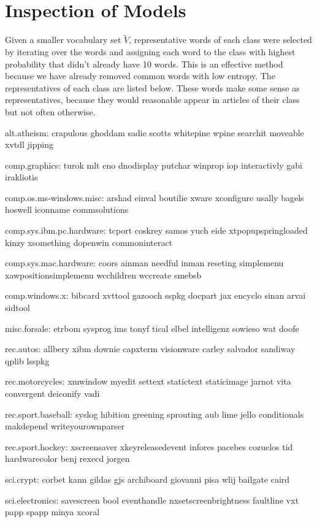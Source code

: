 \documentclass[letterpaper,10pt,onecolumn]{IEEEconf}
\begin{document}
\section{Inspection of Models}

Given a smaller vocabulary set $\tilde{V}$, representative words of each class were selected by iterating over the words and assigning each word to the class with highest probability that didn't already have 10 words. This is an effective method because we have already removed common words with low entropy. The representatives of each class are listed below. These words make some sense as representatives, because they would reasonable appear in articles of their class but not often otherwise.

alt.atheism: 
crapulous
ghoddam
sadie
scotts
whitepine
wpine
searchit
moveable
xvtdl
jipping
 
comp.graphics:
turok
mlt
eno
dnodisplay
putchar
winprop
iop
interactivly
gabi
irakliotis
 
comp.os.ms-windows.misc:
arshad
einval
boutilie
xware
xconfigure
usally
bagels
hoswell
iconname
commsolutions
 
comp.sys.ibm.pc.hardware:
tcport
coskrey
samos
yuch
eide
xtpopupspringloaded
kinzy
xsomething
dopenwin
commoninteract
 
comp.sys.mac.hardware:
coors
ainman
needful
inman
reseting
simplemenu
xawpositionsimplemenu
wcchildren
wccreate
smebsb
 
comp.windows.x:
bibcard
xvttool
gazooch
sspkg
docpart
jax
encyclo
sinan
arvai
sidtool
 
misc.forsale:
etrbom
sysprog
ims
tonyf
tical
elbel
intelligenz
sowieso
wat
doofe
 
rec.autos:
allbery
xibm
downie
capxterm
visionware
carley
salvador
sandiway
qplib
lsspkg
 
rec.motorcycles:
xmwindow
myedit
settext
statictext
staticimage
jarnot
vita
convergent
deiconify
vadi
 
rec.sport.baseball:
syslog
hibition
greening
sprouting
aub
lime
jello
conditionals
makdepend
writeyourownparser
 
rec.sport.hockey:
xscreensaver
xkeyreleasedevent
infores
pacebes
cozuelos
tid
hardwarecolor
benj
rexecd
jorgen
 
sci.crypt:
corbet
kann
gildas
gjs
archiboard
giovanni
pisa
wlij
bailgate
caird
 
sci.electronics:
savescreen
bool
eventhandle
nxsetscreenbrightness
faultline
vxt
papp
spapp
minya
xcoral
 
\end{document}

